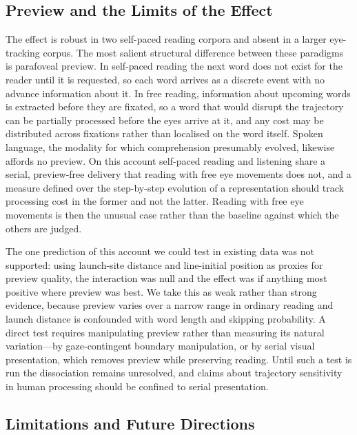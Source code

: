 \documentclass[12pt]{article}
\newcommand{\new}[1]{{\bfseries #1}}
\begin{document}
\new{\subsection{Preview and the Limits of the Effect}

The effect is robust in two self-paced reading corpora and absent in a larger eye-tracking corpus. The most salient structural difference between these paradigms is parafoveal preview. In self-paced reading the next word does not exist for the reader until it is requested, so each word arrives as a discrete event with no advance information about it. In free reading, information about upcoming words is extracted before they are fixated, so a word that would disrupt the trajectory can be partially processed before the eyes arrive at it, and any cost may be distributed across fixations rather than localised on the word itself. Spoken language, the modality for which comprehension presumably evolved, likewise affords no preview. On this account self-paced reading and listening share a serial, preview-free delivery that reading with free eye movements does not, and a measure defined over the step-by-step evolution of a representation should track processing cost in the former and not the latter. Reading with free eye movements is then the unusual case rather than the baseline against which the others are judged.

The one prediction of this account we could test in existing data was not supported: using launch-site distance and line-initial position as proxies for preview quality, the interaction was null and the effect was if anything most positive where preview was best. We take this as weak rather than strong evidence, because preview varies over a narrow range in ordinary reading and launch distance is confounded with word length and skipping probability. A direct test requires manipulating preview rather than measuring its natural variation---by gaze-contingent boundary manipulation, or by serial visual presentation, which removes preview while preserving reading. Until such a test is run the dissociation remains unresolved, and claims about trajectory sensitivity in human processing should be confined to serial presentation.}

\subsection{Limitations and Future Directions}
\end{document}
